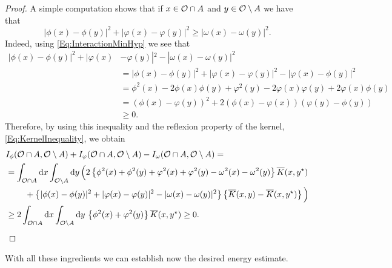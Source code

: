 \begin{proof}
A simple computation shows that if $x\in \mathcal{O} \cap A$ and $y\in \mathcal{O} \setminus A$ we have that
$$ |\phi(x)-\phi(y)|^2+|\varphi(x)-\varphi(y)|^2\geq |\omega(x)-\omega(y)|^2. $$
Indeed, using \eqref{Eq:InteractionMinHyp} we see that
\begin{align*}
|\phi(x)-\phi(y)|^2+|\varphi(x)&-\varphi(y)|^2 - |\omega(x)-\omega(y)|^2 \\
&= |\phi(x)-\phi(y)|^2+|\varphi(x)-\varphi(y)|^2 - |\varphi(x)-\phi(y)|^2 \\
&= \phi^2(x)-2\phi(x)\phi(y)+\varphi^2(y)-2\varphi(x)\varphi(y)+2\varphi(x)\phi(y) \\
&= \left( \phi(x) - \varphi(y)\right) ^2+2\left( \phi(x)-\varphi(x) \right) \left( \varphi(y)-\phi(y) \right) \\
&\geq 0.
\end{align*}
Therefore, by using this inequality and the reflexion property of the kernel, \eqref{Eq:KernelInequality}, we obtain
\begin{align*}
I_\phi(\ocal\cap A, \ocal \setminus A) &+ I_\varphi(\ocal\cap A, \ocal \setminus A) - I_\omega(\ocal\cap A, \ocal \setminus A) =\\
&\hspace{-26mm}= \int_{\ocal\cap A} \! \d x \int_{\ocal\setminus A} \! \d y \, \Big( 2\left\{\phi^2(x)+\phi^2(y)+\varphi^2(x)+\varphi^2(y)-\omega^2(x)-\omega^2(y) \right\} \overline{K}(x,y^\star) \Big.\\
&\hspace{-18mm}\Big.+  \left\{|\phi(x)-\phi(y)|^2+|\varphi(x)-\varphi(y)|^2-|\omega(x)-\omega(y)|^2 \right\} \left\{\overline{K}(x,y)-\overline{K}(x,y^\star)\right\}\Big)\\
&\hspace{-26mm}\geq 2\int_{\ocal\cap A} \! \d x \int_{\ocal\setminus A} \! \d y \, \left\{
\phi^2(x)+\varphi^2(y)\right\} \overline{K}(x,y^\star) \geq 0.
\end{align*}
\end{proof}



With all these ingredients we can establish now the desired energy estimate.


